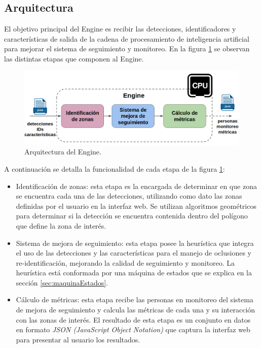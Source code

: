 \subsection{Arquitectura}

El objetivo principal del Engine es recibir las detecciones, identificadores y características de salida de la cadena de procesamiento de inteligencia artificial para mejorar el sistema de seguimiento y monitoreo. En la figura \ref{fig:arquitecturaEngine} se observan las distintas etapas que componen al Engine.

\begin{figure}[ht]
	\centering
	\includegraphics[scale=.5]{./Figures/arquitecturaEngine.png}
	\caption{Arquitectura del Engine.}
	\label{fig:arquitecturaEngine}
\end{figure}

A continuación se detalla la funcionalidad de cada etapa de la figura \ref{fig:arquitecturaEngine}:
\begin{itemize}
\item Identificación de zonas: esta etapa es la encargada de determinar en que zona se encuentra cada una de las detecciones, utilizando como dato las zonas definidas por el usuario en la interfaz web. Se utilizan algoritmos geométricos \citep{POLYGON_TEST_INSIDE} para determinar si la detección se encuentra contenida dentro del polígono que define la zona de interés.
\item Sistema de mejora de seguimiento: esta etapa posee la heurística que integra el uso de las detecciones y las características para el manejo de oclusiones y re-identificación, mejorando la calidad de seguimiento y monitoreo. La heurística está conformada por una máquina de estados que se explica en la sección \ref{sec:maquinaEstados}.
\item Cálculo de métricas: esta etapa recibe las personas en monitoreo del sistema de mejora de seguimiento y calcula las métricas de cada una y su interacción con las zonas de interés. El resultado de esta etapa es un conjunto en datos en formato \textit{JSON (JavaScript Object Notation)} que captura la interfaz web para presentar al usuario los resultados.
\end{itemize}

